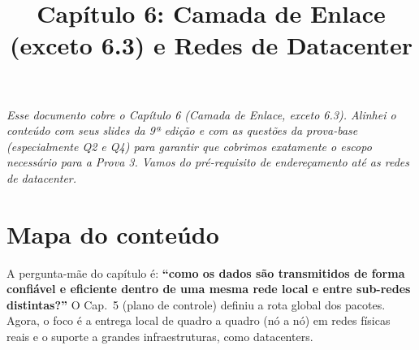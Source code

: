 \documentclass[11pt,a4paper]{article}
\title{Capítulo 6: Camada de Enlace (exceto 6.3) e Redes de Datacenter}
\author{}
\date{}
\begin{document}
\maketitle
\thispagestyle{fancy}
\noindent\textit{Esse documento cobre o {Capítulo 6 (Camada de Enlace, exceto 6.3)}. Alinhei o conteúdo com seus slides da 9ª edição e com as questões da prova-base (especialmente Q2 e Q4) para garantir que cobrimos exatamente o escopo necessário para a Prova 3. Vamos do pré-requisito de endereçamento até as redes de datacenter.}

\section*{Mapa do conteúdo}

A pergunta-mãe do capítulo é: \textbf{``como os dados são transmitidos de forma confiável e eficiente dentro de uma mesma rede local e entre sub-redes distintas?''} O Cap.~5 (plano de controle) definiu a rota global dos pacotes. Agora, o foco é a entrega local de quadro a quadro (nó a nó) em redes físicas reais e o suporte a grandes infraestruturas, como datacenters.
\end{document}
